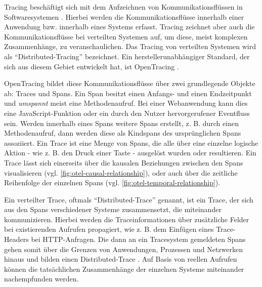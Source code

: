 Tracing beschäftigt sich mit dem Aufzeichnen von Kommunikationsflüssen in Softwaresystemen \cite{TowardsPerformanceToolingInteroperability}. Hierbei werden die Kommunikationsflüsse innerhalb einer Anwendung bzw. innerhalb eines Systems erfasst. Tracing zeichnet aber auch die Kommunikationsflüsse bei verteilten Systemen auf, um diese, meist komplexen Zusammenhänge, zu veranschaulichen. Das Tracing von verteilten Systemen wird als \enquote{Distributed-Tracing} bezeichnet. Ein herstellerunabhängiger Standard, der sich aus diesem Gebiet entwickelt hat, ist OpenTracing \cite{OpenTracing}.

OpenTracing bildet diese Kommunikationsflüsse über zwei grundlegende Objekte ab: Traces und Spans. Ein Span besitzt einen Anfangs- und einen Endzeitpunkt und \textit{umspannt} meist eine Methodenaufruf. Bei einer Webanwendung kann dies eine JavaScript-Funktion oder ein durch den Nutzer hervorgerufener Eventfluss sein. Werden innerhalb eines Spans weitere Spans erstellt, z. B. durch einen Methodenaufruf, dann werden diese als Kindspans des ursprünglichen Spans assoziiert. Ein Trace ist eine Menge von Spans, die alle über eine einzelne logische Aktion - wie z. B. den Druck einer Taste - ausgelöst wurden oder resultieren. Ein Trace lässt sich einerseits über die kausalen Beziehungen zwischen den Spans visualisieren (vgl. \autoref{fig:otel-causal-relationship}), oder auch über die zeitliche Reihenfolge der einzelnen Spans (vgl. \autoref{fig:otel-temporal-relationship}).

Ein verteilter Trace, oftmals \enquote{Distributed-Trace} genannt, ist ein Trace, der sich aus den Spans verschiedener Systeme zusammensetzt, die miteinander kommunizieren. Hierbei werden die Traceinformationen über zusätzliche Felder bei existierenden Aufrufen propagiert, wie z. B. dem Einfügen eines Trace-Headers bei HTTP-Anfragen. Die dann an ein Tracesystem gemeldeten Spans gehen somit über die Grenzen von Anwendungen, Prozessen und Netzwerken hinaus und bilden einen Distributed-Trace \cite{OpenTracingSpecification}. Auf Basis von reellen Aufrufen können die tatsächlichen Zusammenhänge der einzelnen Systeme miteinander nachempfunden werden.

 
